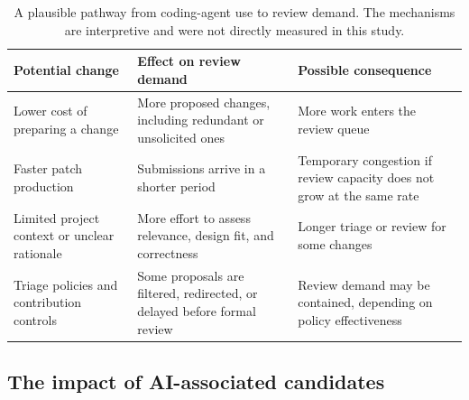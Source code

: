 \documentclass[smallextended,natbib]{svjour3}
\begin{document}

\begin{table}[t]
\caption{A plausible pathway from coding-agent use to review demand.
The mechanisms are interpretive and were not directly measured in this
study.}
\label{tab:ai-review-demand}
\centering
\begin{tabularx}{\linewidth}{@{}Y Y Y@{}}
\toprule
Potential change & Effect on review demand & Possible consequence \\
\midrule
Lower cost of preparing a change &
More proposed changes, including redundant or unsolicited ones &
More work enters the review queue \\
Faster patch production &
Submissions arrive in a shorter period &
Temporary congestion if review capacity does not grow at the same rate \\
Limited project context or unclear rationale &
More effort to assess relevance, design fit, and correctness &
Longer triage or review for some changes \\
Triage policies and contribution controls &
Some proposals are filtered, redirected, or delayed before formal review &
Review demand may be contained, depending on policy effectiveness \\
\bottomrule
\end{tabularx}
\end{table}

\subsection{The impact of AI-associated candidates}
\end{document}
